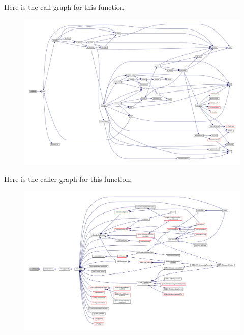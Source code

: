 Here is the call graph for this function\+:
\nopagebreak
\begin{figure}[H]
\begin{center}
\leavevmode
\includegraphics[width=350pt]{vfs-fd_8c_a4d32fae21137dfbf535bcc4a0212d862_cgraph}
\end{center}
\end{figure}
Here is the caller graph for this function\+:
\nopagebreak
\begin{figure}[H]
\begin{center}
\leavevmode
\includegraphics[width=350pt]{vfs-fd_8c_a4d32fae21137dfbf535bcc4a0212d862_icgraph}
\end{center}
\end{figure}
\mbox{\label{vfs-fd_8c_a61523db03b21435b98c34ed1d783bbc9}} 
